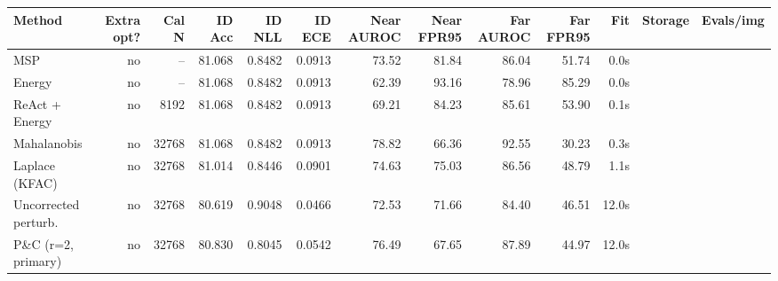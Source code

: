 \begin{tabular}{lrrrrrrrrrr}
\toprule
Method & Extra opt? & Cal N & ID Acc & ID NLL & ID ECE & Near AUROC & Near FPR95 & Far AUROC & Far FPR95 & Fit & Storage & Evals/img \\
\midrule
MSP & no & -- & 81.068 & 0.8482 & 0.0913 & 73.52 & 81.84 & 86.04 & 51.74 & 0.0s \\
Energy & no & -- & 81.068 & 0.8482 & 0.0913 & 62.39 & 93.16 & 78.96 & 85.29 & 0.0s \\
ReAct + Energy & no & 8192 & 81.068 & 0.8482 & 0.0913 & 69.21 & 84.23 & 85.61 & 53.90 & 0.1s \\
Mahalanobis & no & 32768 & 81.068 & 0.8482 & 0.0913 & 78.82 & 66.36 & 92.55 & 30.23 & 0.3s \\
Laplace (KFAC) & no & 32768 & 81.014 & 0.8446 & 0.0901 & 74.63 & 75.03 & 86.56 & 48.79 & 1.1s \\
Uncorrected perturb. & no & 32768 & 80.619 & 0.9048 & 0.0466 & 72.53 & 71.66 & 84.40 & 46.51 & 12.0s \\
P\&C (r=2, primary) & no & 32768 & 80.830 & 0.8045 & 0.0542 & 76.49 & 67.65 & 87.89 & 44.97 & 12.0s \\
\bottomrule
\end{tabular}
